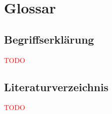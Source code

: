 \documentclass[]{subfiles}
\begin{document}
\section*{Glossar}

\subsection*{Begriffserklärung}
    \textcolor{red}{TODO}

\clearpage
{}
\listoffigures*
\clearpage
\listoftables*

\newpage
\subsection*{Literaturverzeichnis}
    \textcolor{red}{TODO}
\end{document}
